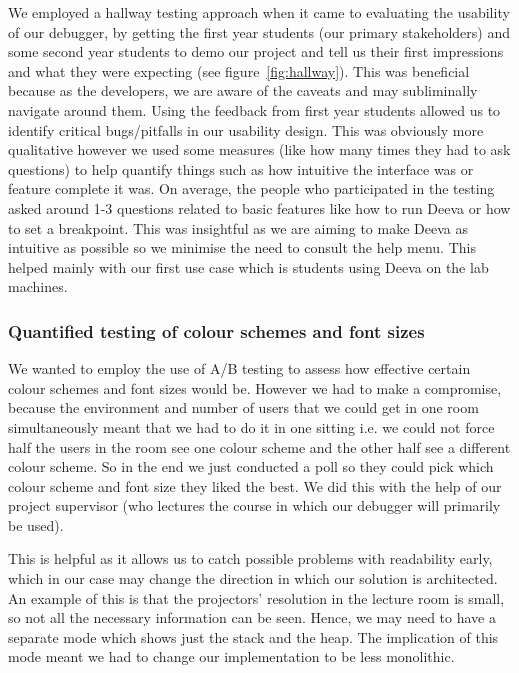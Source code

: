 \documentclass[11pt, a4paper]{article}
\begin{document}
We employed a hallway testing approach when it came to evaluating the usability of our debugger, by getting the first year students (our primary stakeholders) and some second year students to demo our project and tell us their first impressions and what they were expecting (see figure~\ref{fig:hallway}). This was beneficial because as the developers, we are aware of the caveats and may subliminally navigate around them.
Using the feedback from first year students allowed us to identify critical bugs/pitfalls in our usability design.
This was obviously more qualitative however we used some measures (like how many times they had to ask questions) to help quantify things such as how intuitive the interface was or feature complete it was.
On average, the people who participated in the testing asked around 1-3 questions related to basic features like how to run Deeva or how to set a breakpoint.
This was insightful as we are aiming to make Deeva as intuitive as possible so we minimise the need to consult the help menu.
This helped mainly with our first use case which is students using Deeva on the lab machines.

\subsubsection{Quantified testing of colour schemes and font sizes}
We wanted to employ the use of A/B testing to assess how effective certain colour schemes and font sizes would be.
However we had to make a compromise, because the environment and number of users that we could get in one room simultaneously meant that we had to do it in one sitting i.e. we could not force half the users in the room see one colour scheme and the other half see a different colour scheme.
So in the end we just conducted a poll so they could pick which colour scheme and font size they liked the best.
We did this with the help of our project supervisor (who lectures the course in which our debugger will primarily be used). 

This is helpful as it allows us to catch possible problems with readability early, which in our case may change the direction in which our solution is architected.
An example of this is that the projectors’ resolution in the lecture room is small, so not all the necessary information can be seen.
Hence, we may need to have a separate mode which shows just the stack and the heap.
The implication of this mode meant we had to change our implementation to be less monolithic.
\end{document}

